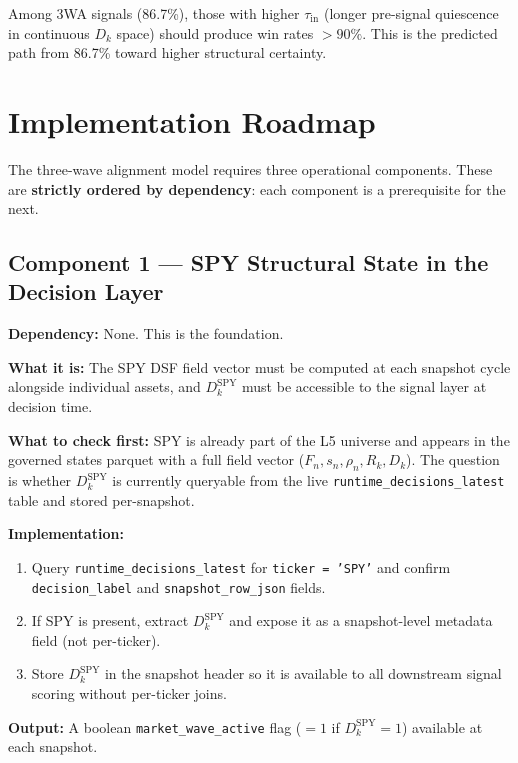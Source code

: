 \documentclass[11pt, a4paper]{article}
\newcommand{\Fn}{F_n}
\newcommand{\sn}{s_n}
\newcommand{\rhon}{\rho_n}
\newcommand{\Rk}{R_k}
\newcommand{\Dk}{D_k}
\newcommand{\tauin}{\tau_{\mathrm{in}}}
\theoremstyle{definition}
\begin{document}
Among 3WA signals (86.7\%), those with higher $\tauin$ (longer pre-signal
quiescence in continuous $\Dk$ space) should produce win rates $> 90\%$.
This is the predicted path from 86.7\% toward higher structural certainty.

\section{Implementation Roadmap}

The three-wave alignment model requires three operational components.
These are \textbf{strictly ordered by dependency}: each component is a
prerequisite for the next.

\subsection{Component 1 — SPY Structural State in the Decision Layer}
\label{sec:impl1}

\textbf{Dependency:} None. This is the foundation.

\textbf{What it is:}
The SPY DSF field vector must be computed at each snapshot cycle alongside
individual assets, and $D_k^{\mathrm{SPY}}$ must be accessible to the signal
layer at decision time.

\textbf{What to check first:}
SPY is already part of the L5 universe and appears in the governed states
parquet with a full field vector ($\Fn, \sn, \rhon, \Rk, \Dk$).
The question is whether $D_k^{\mathrm{SPY}}$ is currently queryable from the
live \texttt{runtime\_decisions\_latest} table and stored per-snapshot.

\textbf{Implementation:}
\begin{enumerate}
  \item Query \texttt{runtime\_decisions\_latest} for \texttt{ticker = 'SPY'} and
        confirm \texttt{decision\_label} and \texttt{snapshot\_row\_json} fields.
  \item If SPY is present, extract $D_k^{\mathrm{SPY}}$ and expose it as a
        snapshot-level metadata field (not per-ticker).
  \item Store $D_k^{\mathrm{SPY}}$ in the snapshot header so it is available
        to all downstream signal scoring without per-ticker joins.
\end{enumerate}

\textbf{Output:} A boolean \texttt{market\_wave\_active} flag ($= 1$ if
$D_k^{\mathrm{SPY}} = 1$) available at each snapshot.
\end{document}

